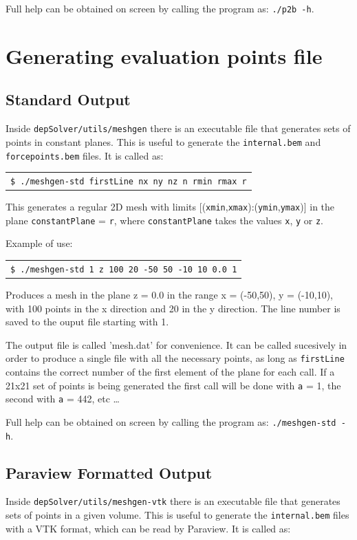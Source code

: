 \documentclass[12pt]{report}
\begin{document}
Full help can be obtained on screen by calling the program as: \texttt{./p2b -h}.

\section{Generating evaluation points file}\label{meshgen-std}
\subsection{Standard Output}
Inside \verb+depSolver/utils/meshgen+ there is an executable file that generates sets of points in constant planes. This is useful to generate the \verb+internal.bem+ and \verb+forcepoints.bem+ files. It is called as:

\begin{tabular}{l}
\texttt{\$ ./meshgen-std firstLine nx ny nz n rmin rmax r}
\end{tabular}

This generates a regular 2D mesh with limits [(\verb+xmin+,\verb+xmax+):(\verb+ymin+,\verb+ymax+)] in the plane
\verb+constantPlane+ = \verb+r+, where \verb+constantPlane+ takes the values \verb+x+, \verb+y+ or \verb+z+.

Example of use:

\begin{tabular}{l}
\texttt{\$ ./meshgen-std 1 z 100 20 -50 50 -10 10 0.0 1}
\end{tabular}

Produces a mesh in the plane z = 0.0 in the range x = (-50,50), y = (-10,10), with 100 points in the x direction and 20 in the y direction. The line number is saved to the ouput file starting with 1.

The output file is called 'mesh.dat' for convenience. It can be called sucesively in order to produce a single file with all the necessary points, as long as \verb+firstLine+ contains the correct number of the first element of the plane for each call. If a 21x21 set of points is being generated the first call will be done with \verb+a+ = 1, the second with \verb+a+ = 442, etc \ldots

Full help can be obtained on screen by calling the program as: \texttt{./meshgen-std -h}.

\subsection{Paraview Formatted Output}
Inside \verb+depSolver/utils/meshgen-vtk+ there is an executable file that generates sets of points in a given volume. This is useful to generate the \verb+internal.bem+ files with a VTK format, which can be read by Paraview. It is called as:
\end{document}
